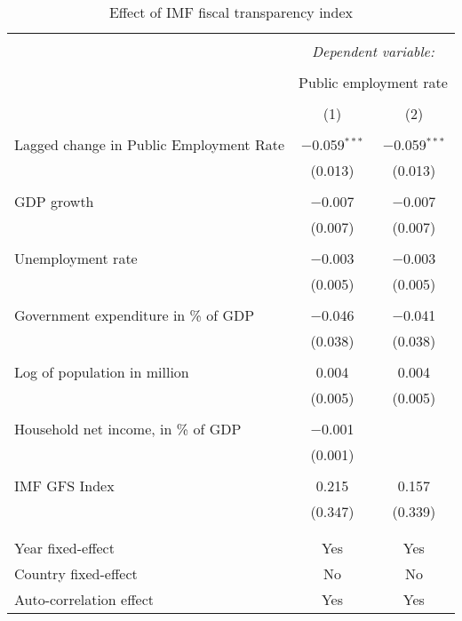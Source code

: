 
\begin{table}[!htbp] \centering 
  \caption{Effect of IMF fiscal transparency index} 
  \label{} 
\begin{tabular}{@{\extracolsep{5pt}}lcc} 
\\[-1.8ex]\hline 
\hline \\[-1.8ex] 
 & \multicolumn{2}{c}{\textit{Dependent variable:}} \\ 
\cline{2-3} 
\\[-1.8ex] & \multicolumn{2}{c}{Public employment rate} \\ 
\\[-1.8ex] & (1) & (2)\\ 
\hline \\[-1.8ex] 
 Lagged change in Public Employment Rate & $-$0.059$^{***}$ & $-$0.059$^{***}$ \\ 
  & (0.013) & (0.013) \\ 
  & & \\ 
 GDP growth & $-$0.007 & $-$0.007 \\ 
  & (0.007) & (0.007) \\ 
  & & \\ 
 Unemployment rate & $-$0.003 & $-$0.003 \\ 
  & (0.005) & (0.005) \\ 
  & & \\ 
 Government expenditure in \% of GDP & $-$0.046 & $-$0.041 \\ 
  & (0.038) & (0.038) \\ 
  & & \\ 
 Log of population in million & 0.004 & 0.004 \\ 
  & (0.005) & (0.005) \\ 
  & & \\ 
 Household net income, in \% of GDP & $-$0.001 &  \\ 
  & (0.001) &  \\ 
  & & \\ 
 IMF GFS Index & 0.215 & 0.157 \\ 
  & (0.347) & (0.339) \\ 
  & & \\ 
\hline \\[-1.8ex] 
Year fixed-effect & Yes & Yes \\ 
Country fixed-effect & No & No \\ 
Auto-correlation effect & Yes & Yes \\ 

\end{tabular}
\end{table}
